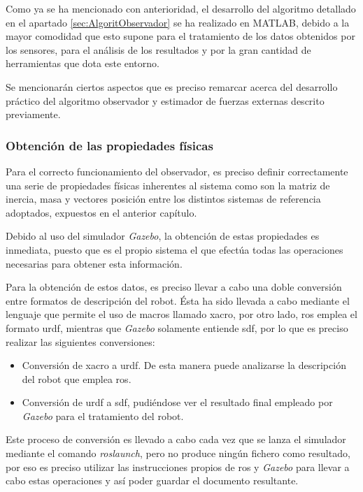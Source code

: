 Como ya se ha mencionado con anterioridad, el desarrollo del algoritmo detallado en el apartado \ref{sec:AlgoritObservador} se ha realizado en MATLAB, debido a la mayor comodidad que esto supone para el tratamiento de los datos obtenidos por los sensores, para el análisis de los resultados y por la gran cantidad de herramientas que dota este entorno. \par

Se mencionarán ciertos aspectos que es preciso remarcar acerca del desarrollo práctico del algoritmo observador y estimador de fuerzas externas descrito previamente. \par 

\subsubsection{Obtención de las propiedades físicas}

Para el correcto funcionamiento del observador, es preciso definir correctamente una serie de propiedades físicas inherentes al sistema como son la matriz de inercia, masa y vectores posición entre los distintos sistemas de referencia adoptados, expuestos en el anterior capítulo. \par 

Debido al uso del simulador \emph{Gazebo}, la obtención de estas propiedades es inmediata, puesto que es el propio sistema el que efectúa todas las operaciones necesarias para obtener esta información. \par 

Para la obtención de estos datos, es preciso llevar a cabo una doble conversión entre formatos de descripción del robot. Ésta ha sido llevada a cabo mediante el lenguaje que permite el uso de macros llamado \acrshort{xacro}, por otro lado, \acrshort{ros} emplea el formato \acrshort{urdf}, mientras que \emph{Gazebo} solamente entiende \acrshort{sdf}, por lo que es preciso realizar las siguientes conversiones:

\begin{itemize}
\item Conversión de \acrshort{xacro} a \acrshort{urdf}. De esta manera puede analizarse la descripción del robot que emplea \acrshort{ros}.
\item Conversión de \acrshort{urdf} a \acrshort{sdf}, pudiéndose ver el resultado final empleado por \emph{Gazebo} para el tratamiento del robot.
\end{itemize}

Este proceso de conversión es llevado a cabo cada vez que se lanza el simulador mediante el comando \emph{roslaunch}, pero no produce ningún fichero como resultado, por eso es preciso utilizar las instrucciones propios de \acrshort{ros} y \emph{Gazebo} para llevar a cabo estas operaciones y así poder guardar el documento resultante. \par 

